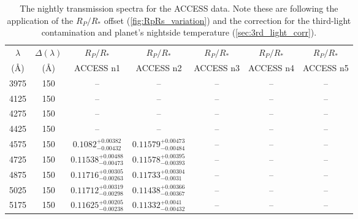 \documentclass[twocolumn]{aastex63}
\begin{document}
\begin{table*}[ht!]
\caption{The nightly transmission spectra for the ACCESS data. Note these are following the application of the $R_P/R_*$ offset (\autoref{fig:RpRs_variation}) and the correction for the third-light contamination and planet's nightside temperature (\autoref{sec:3rd_light_corr}).}
\label{tab:ts_ACCESS}
\centering
\begin{tabular}{ccccccc} \hline
$\lambda$ &     $\Delta(\lambda)$     & $R_P/R_*$ & $R_P/R_*$ & $R_P/R_*$ & $R_P/R_*$ & $R_P/R_*$ \\ 
(\AA) & (\AA) & ACCESS n1 & ACCESS n2 & ACCESS n3 & ACCESS n4 & ACCESS n5 \\ \hline
3975     &      150 &                              -- &                              -- &                              -- &                              -- &                              -- \\
4125     &      150 &                              -- &                              -- &                              -- &                              -- &                              -- \\
4275     &      150 &                              -- &                              -- &                              -- &                              -- &                              -- \\
4425     &      150 &                              -- &                              -- &                              -- &                              -- &                              -- \\
4575     &      150 &   $0.1082^{+0.00382}_{-0.00432}$ &  $0.11579^{+0.00473}_{-0.00484}$ &                              -- &                              -- &                              -- \\
4725     &      150 &  $0.11538^{+0.00488}_{-0.00473}$ &  $0.11578^{+0.00395}_{-0.00393}$ &                              -- &                              -- &                              -- \\
4875     &      150 &  $0.11716^{+0.00305}_{-0.00263}$ &   $0.11733^{+0.00304}_{-0.0031}$ &                              -- &                              -- &                              -- \\
5025     &      150 &  $0.11712^{+0.00319}_{-0.00298}$ &  $0.11438^{+0.00366}_{-0.00367}$ &                              -- &                              -- &                              -- \\
5175     &      150 &  $0.11625^{+0.00205}_{-0.00238}$ &   $0.11332^{+0.0041}_{-0.00432}$ &                              -- &                              -- &                              -- \\

\end{tabular}
\end{table*}
\end{document}
